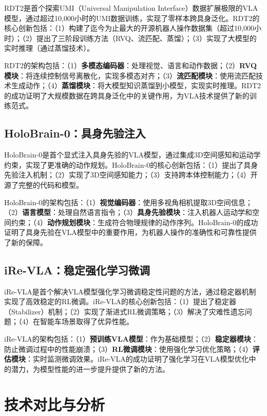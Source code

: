 \documentclass[12pt,a4paper]{article}
\begin{document}
RDT2\cite{rdt2}是首个探索UMI（Universal Manipulation Interface）数据扩展极限的VLA模型，通过超过10,000小时的UMI数据训练，实现了零样本跨具身泛化。RDT2的核心创新包括：（1）构建了迄今为止最大的开源机器人操作数据集（超过10,000小时）；（2）提出了三阶段训练方法（RVQ、流匹配、蒸馏）；（3）实现了大模型的实时推理（通过蒸馏技术）。

RDT2的架构包括：（1）\textbf{多模态编码器}：处理视觉、语言和动作数据；（2）\textbf{RVQ模块}：将连续控制信号离散化，实现多模态对齐；（3）\textbf{流匹配模块}：使用流匹配技术生成动作；（4）\textbf{蒸馏模块}：将大模型知识蒸馏到小模型，实现实时推理。RDT2的成功证明了大规模数据在跨具身泛化中的关键作用，为VLA技术提供了新的训练范式。

\subsection{HoloBrain-0：具身先验注入}

HoloBrain-0\cite{holobrain0}是首个显式注入具身先验的VLA模型，通过集成3D空间感知和运动学约束，实现了更准确的动作规划。HoloBrain-0的核心创新包括：（1）提出了具身先验注入机制；（2）实现了3D空间感知能力；（3）支持跨本体控制能力；（4）开源了完整的代码和模型。

HoloBrain-0的架构包括：（1）\textbf{视觉编码器}：使用多视角相机提取3D空间信息；（2）\textbf{语言模型}：处理自然语言指令；（3）\textbf{具身先验模块}：注入机器人运动学和空间约束；（4）\textbf{动作规划模块}：生成符合物理规律的动作序列。HoloBrain-0的成功证明了具身先验在VLA模型中的重要作用，为机器人操作的准确性和可靠性提供了新的保障。

\subsection{iRe-VLA：稳定强化学习微调}

iRe-VLA\cite{irevla}是首个解决VLA模型强化学习微调稳定性问题的方法，通过稳定器机制实现了高效稳定的RL微调。iRe-VLA的核心创新包括：（1）提出了稳定器（Stabilizer）机制；（2）实现了渐进式RL微调策略；（3）解决了灾难性遗忘问题；（4）在智能车场景取得了优异性能。

iRe-VLA的架构包括：（1）\textbf{预训练VLA模型}：作为基础模型；（2）\textbf{稳定器模块}：防止微调过程中的性能崩溃；（3）\textbf{RL微调模块}：使用强化学习优化策略；（4）\textbf{评估模块}：实时监测微调效果。iRe-VLA的成功证明了强化学习在VLA模型优化中的潜力，为模型性能的进一步提升提供了新的方法。

\section{技术对比与分析}
\end{document}
